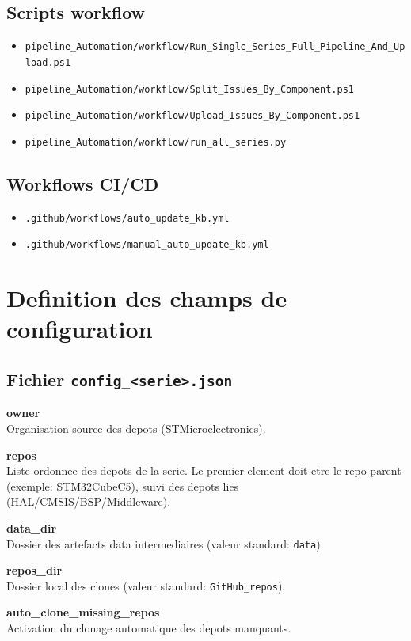 \documentclass[11pt,a4paper]{article}
\begin{document}
\subsection{Scripts workflow}
\begin{itemize}[leftmargin=*]
  \item \texttt{pipeline\_Automation/workflow/Run\_Single\_Series\_Full\_Pipeline\_And\_Upload.ps1}
  \item \texttt{pipeline\_Automation/workflow/Split\_Issues\_By\_Component.ps1}
  \item \texttt{pipeline\_Automation/workflow/Upload\_Issues\_By\_Component.ps1}
  \item \texttt{pipeline\_Automation/workflow/run\_all\_series.py}
\end{itemize}

\subsection{Workflows CI/CD}
\begin{itemize}[leftmargin=*]
  \item \texttt{.github/workflows/auto\_update\_kb.yml}
  \item \texttt{.github/workflows/manual\_auto\_update\_kb.yml}
\end{itemize}

\section{Definition des champs de configuration}
\subsection{Fichier \texttt{config\_<serie>.json}}
\textbf{owner}\\
Organisation source des depots (STMicroelectronics).

\textbf{repos}\\
Liste ordonnee des depots de la serie. Le premier element doit etre le repo parent
(exemple: STM32CubeC5), suivi des depots lies (HAL/CMSIS/BSP/Middleware).

\textbf{data\_dir}\\
Dossier des artefacts data intermediaires (valeur standard: \texttt{data}).

\textbf{repos\_dir}\\
Dossier local des clones (valeur standard: \texttt{GitHub\_repos}).

\textbf{auto\_clone\_missing\_repos}\\
Activation du clonage automatique des depots manquants.
\end{document}

